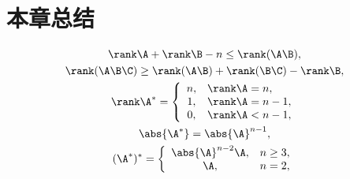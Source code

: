\section{本章总结}
\begin{gather*}
	\rank\A + \rank\B - n \leq \rank(\A\B), \\
	\rank(\A\B\C) \geq \rank(\A\B) + \rank(\B\C) - \rank\B, \\
	\rank\A^* = \left\{ \begin{array}{cl}
		n, & \rank\A=n, \\
		1, & \rank\A=n-1, \\
		0, & \rank\A<n-1,
	\end{array} \right. \\
	\abs{\A^*} = \abs{\A}^{n-1}, \\
	(\A^*)^* = \left\{ \begin{array}{cl}
		\abs{\A}^{n-2} \A, & n\geq3, \\
		\A, & n=2,
	\end{array} \right.
\end{gather*}
